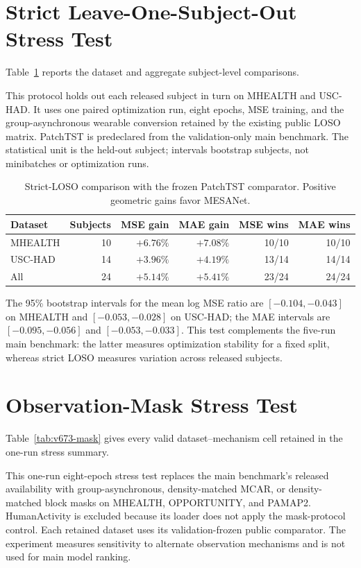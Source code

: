 \documentclass[letterpaper,10pt]{article}
\begin{document}
\section{Strict Leave-One-Subject-Out Stress Test}

Table~\ref{tab:v672-loso} reports the dataset and aggregate subject-level
comparisons.

This protocol holds out each released subject in turn on MHEALTH and USC-HAD.
It uses one paired optimization run, eight epochs, MSE training, and the
group-asynchronous wearable conversion retained by the existing public LOSO
matrix. PatchTST is predeclared from the validation-only main benchmark. The
statistical unit is the held-out subject; intervals bootstrap subjects, not
minibatches or optimization runs.

\begin{table}[H]
\centering
\setlength{\tabcolsep}{5pt}
\caption{Strict-LOSO comparison with the frozen PatchTST comparator. Positive geometric gains favor MESANet.}
\label{tab:v672-loso}
\begin{tabular}{@{}lrrrrr@{}}
\toprule
Dataset & Subjects & MSE gain & MAE gain & MSE wins & MAE wins \\
\midrule
MHEALTH & 10 & $+6.76\%$ & $+7.08\%$ & 10/10 & 10/10 \\
USC-HAD & 14 & $+3.96\%$ & $+4.19\%$ & 13/14 & 14/14 \\
All & 24 & $+5.14\%$ & $+5.41\%$ & 23/24 & 24/24 \\
\bottomrule
\end{tabular}
\end{table}

The 95\% bootstrap intervals for the mean log MSE ratio are
$[-0.104,-0.043]$ on MHEALTH and $[-0.053,-0.028]$ on USC-HAD; the MAE
intervals are $[-0.095,-0.056]$ and $[-0.053,-0.033]$. This test complements
the five-run main benchmark: the latter measures optimization stability for a
fixed split, whereas strict LOSO measures variation across released subjects.

\section{Observation-Mask Stress Test}

Table~\ref{tab:v673-mask} gives every valid dataset--mechanism cell retained in
the one-run stress summary.

This one-run eight-epoch stress test replaces the main benchmark's released
availability with group-asynchronous, density-matched MCAR, or density-matched
block masks on MHEALTH, OPPORTUNITY, and PAMAP2. HumanActivity is excluded
because its loader does not apply the mask-protocol control. Each retained
dataset uses its validation-frozen public comparator. The experiment measures
sensitivity to alternate observation mechanisms and is not used for main
model ranking.
\end{document}
